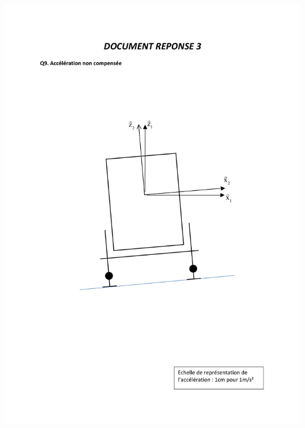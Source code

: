 

\newpage




\newpage


\begin{center}
\includegraphics[width=0.9\linewidth]{img/Q3}
\end{center}

\newpage




\newpage


